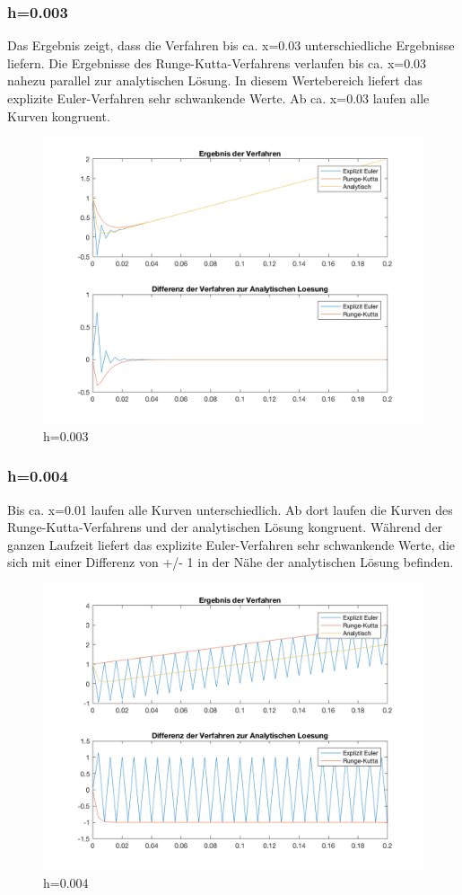 \documentclass[]{scrartcl}
\begin{document}
\subsubsection{h=0.003}
Das Ergebnis zeigt, dass die Verfahren bis ca. x=0.03 unterschiedliche Ergebnisse liefern. Die Ergebnisse des Runge-Kutta-Verfahrens verlaufen bis ca. x=0.03 nahezu parallel zur analytischen Lösung. In diesem Wertebereich liefert das explizite Euler-Verfahren sehr schwankende Werte. Ab ca. x=0.03 laufen alle Kurven kongruent.
\begin{figure}[htbp]
	\centering
	\includegraphics[width=1\linewidth]{a1_1_2}
	\caption{h=0.003}
	\label{fig:a1_1_2}
\end{figure}

\subsubsection{h=0.004}
Bis ca. x=0.01 laufen alle Kurven unterschiedlich. Ab dort laufen die Kurven des Runge-Kutta-Verfahrens und der analytischen Lösung kongruent. Während der ganzen Laufzeit liefert das explizite Euler-Verfahren sehr schwankende Werte, die sich mit einer Differenz von +/- 1 in der Nähe der analytischen Lösung befinden.
\begin{figure}[htbp]
	\centering
	\includegraphics[width=1\linewidth]{a1_1_3}
	\caption{h=0.004}
	\label{fig:a1_1_3}
\end{figure}
\end{document}

